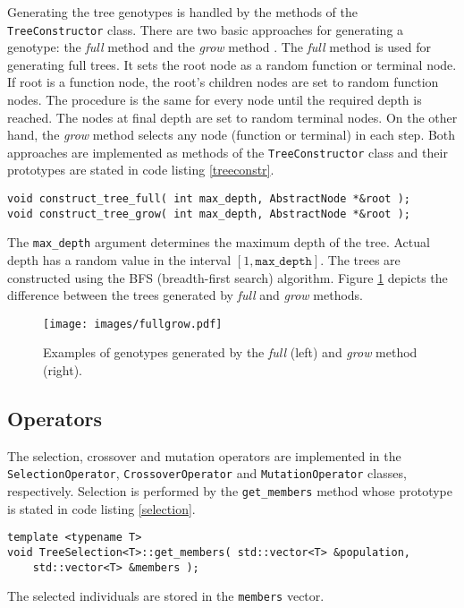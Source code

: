 Generating the tree genotypes is handled by the methods of the \texttt{TreeConstructor} class.
There are two basic approaches for generating a genotype: the \textit{full} method and the \textit{grow} method \cite{koza1992genetic}.
The \textit{full} method is used for generating full trees. 
It sets the root node as a random function or terminal node.
If root is a function node, the root's children nodes are set to random function nodes.
The procedure is the same for every node until the required depth is reached.
The nodes at final depth are set to random terminal nodes.
On the other hand, the \textit{grow} method selects any node (function or terminal) in each step.
Both approaches are implemented as methods of the \texttt{TreeConstructor} class and their prototypes are stated in code listing \ref{treeconstr}.
\begin{lstlisting}[frame=none, label={treeconstr}, caption={Functions for implementing the \textit{full} and \textit{grow} methods for creating a genotype.}, captionpos=b]
void construct_tree_full( int max_depth, AbstractNode *&root );
void construct_tree_grow( int max_depth, AbstractNode *&root );
\end{lstlisting}
The \texttt{max\_depth} argument determines the maximum depth of the tree.
Actual depth has a random value in the interval $[1, \texttt{max\_depth}]$.
The trees are constructed using the BFS (breadth-first search) algorithm.
Figure \ref{fullgrow} depicts the difference between the trees generated by \textit{full} and \textit{grow} methods.
\begin{figure}[ht]
    \centering
    \texttt{[image: images/fullgrow.pdf]}
    \caption{Examples of genotypes generated by the \textit{full} (left) and \textit{grow} method (right).}
    \label{fullgrow}
\end{figure}

\subsection{Operators}
The selection, crossover and mutation operators are implemented in the \texttt{SelectionOperator}, \texttt{CrossoverOperator} and \texttt{MutationOperator} classes, respectively.
Selection is performed by the \texttt{get\_members} method whose prototype is stated in code listing \ref{selection}.
\begin{lstlisting}[frame=none, label={selection}, caption={Prototype of the \texttt{get\_members} method which performs selection.}, captionpos=b]
template <typename T>
void TreeSelection<T>::get_members( std::vector<T> &population, 
	std::vector<T> &members );
\end{lstlisting}
The selected individuals are stored in the \texttt{members} vector.

